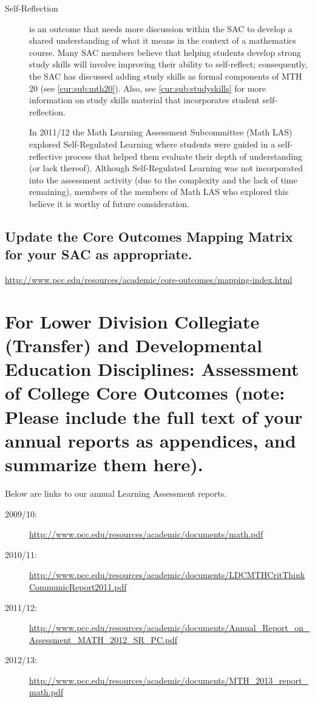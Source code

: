 \begin{description}
\item[Self-Reflection] is an outcome that needs more discussion within the SAC to develop a shared understanding of what it means in the context of a mathematics course.  Many SAC members believe that helping students develop strong study skills will involve improving their ability to self-reflect; consequently, the SAC has discussed adding study skills as formal components of MTH 20 (see \vref{cur:sub:mth20}).  Also,  see \vref{cur:sub:studyskills} for more information on study skills material that incorporates student self-reflection. 

In 2011/12 the Math Learning Assessment Subcommittee (Math LAS) explored Self-Regulated Learning where students were guided in a self-reflective process that helped them evaluate their depth of understanding (or lack thereof).  Although Self-Regulated Learning was not incorporated into the assessment activity (due to the complexity and the lack of time remaining), members of the members of Math LAS who explored this believe it is worthy of future consideration.

\end{description}

\subsection{Update the Core Outcomes Mapping Matrix for your SAC as appropriate.}\url{http://www.pcc.edu/resources/academic/core-outcomes/mapping-index.html} 




\section[Assessment of College Core Outcomes]{For Lower Division Collegiate (Transfer) and Developmental Education Disciplines:  Assessment of College Core Outcomes    (note:  Please include the full text of your annual reports as appendices, and summarize them here).  }

Below are links to our annual Learning Assessment reports. 

\begin{description}
\item[2009/10:] \url{http://www.pcc.edu/resources/academic/documents/math.pdf}
\item[2010/11:] \url{http://www.pcc.edu/resources/academic/documents/LDCMTHCritThinkCommunicReport2011.pdf}
\item[2011/12:] \url{http://www.pcc.edu/resources/academic/documents/Annual_Report_on_Assessment_MATH_2012_SR_PC.pdf}
\item[2012/13:] \url{http://www.pcc.edu/resources/academic/documents/MTH_2013_report_math.pdf}
\end{description}

